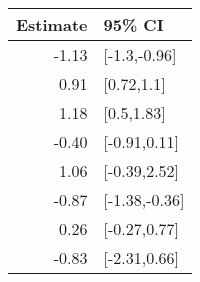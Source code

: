 \begin{tabular}{rl}
  \hline
Estimate & 95\% CI \\ 
  \hline
-1.13 & [-1.3,-0.96] \\ 
  0.91 & [0.72,1.1] \\ 
  1.18 & [0.5,1.83] \\ 
  -0.40 & [-0.91,0.11] \\ 
  1.06 & [-0.39,2.52] \\ 
  -0.87 & [-1.38,-0.36] \\ 
  0.26 & [-0.27,0.77] \\ 
  -0.83 & [-2.31,0.66] \\ 
   \hline
\end{tabular}

